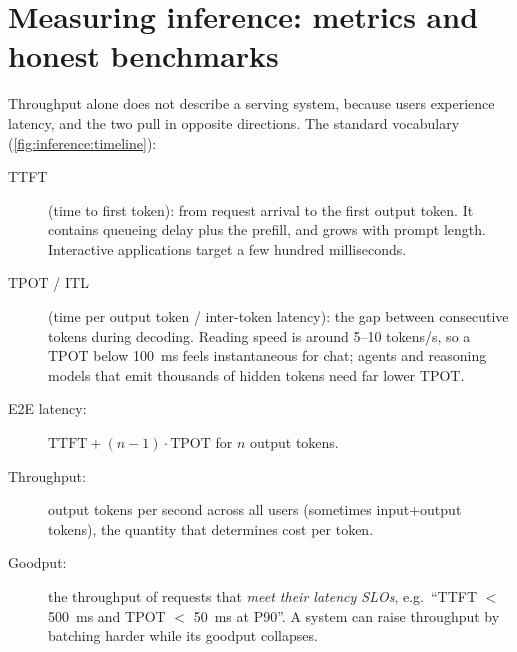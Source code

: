 \section{Measuring inference: metrics and honest benchmarks}\label{sec:inference:metrics}

Throughput alone does not describe a serving system, because users experience latency, and the two
pull in opposite directions. The standard vocabulary (\cref{fig:inference:timeline}):

\begin{description}
  \item[TTFT] (time to first token): from request arrival to the first output token. It contains
    queueing delay plus the prefill, and grows with prompt length. Interactive applications target
    a few hundred milliseconds.
  \item[TPOT / ITL] (time per output token / inter-token latency): the gap between consecutive
    tokens during decoding. Reading speed is around 5--10 tokens/s, so a TPOT below
    \SI{100}{ms} feels instantaneous for chat; agents and reasoning models that emit thousands of
    hidden tokens need far lower TPOT.
  \item[E2E latency:] $\text{TTFT} + (n-1)\cdot\text{TPOT}$ for $n$ output tokens.
  \item[Throughput:] output tokens per second across all users (sometimes input+output tokens),
    the quantity that determines cost per token.
  \item[Goodput:] the throughput of requests that \emph{meet their latency SLOs}, e.g.\ ``TTFT
    $<$ \SI{500}{ms} and TPOT $<$ \SI{50}{ms} at P90''. A system can raise throughput by batching
    harder while its goodput collapses.
\end{description}

